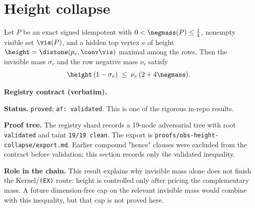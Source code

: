 \section{Height collapse}\label{sec:height-collapse}

\begin{observation}\label{obs:height-collapse}
Let $P$ be an exact signed idempotent with $0<\negmass(P)\le\tfrac14$, nonempty
visible set $\vis(P)$, and a hidden top vertex $v$ of height
$\height=\distone(p_v,\conv\vis)$ maximal among the rows. Then the invisible
mass $\sigma_v$ and the row negative mass $\nu_v$ satisfy
\[
  \height\,(1-\sigma_v)\;\le\;\nu_v\,(2+4\negmass).
\]
\end{observation}

\noindent\textbf{Registry contract (verbatim).}

\noindent\textbf{Status.} \texttt{proved}; \texttt{af: validated}.
This is one of the rigorous in-repo results.

\noindent\textbf{Proof tree.} The registry shard records a 19-node
adversarial tree with root \texttt{validated} and taint \texttt{19/19
clean}.  The export is
\texttt{proofs/obs-height-collapse/export.md}.  Earlier compound
"hence" clauses were excluded from the contract before validation; this
section records only the validated inequality.

\noindent\textbf{Role in the chain.} This result explains why invisible
mass alone does not finish the Kernel/\texttt{(EX)} route: height is
controlled only after pricing the complementary mass.  A future
dimension-free cap on the relevant invisible mass would combine with
this inequality, but that cap is not proved here.
